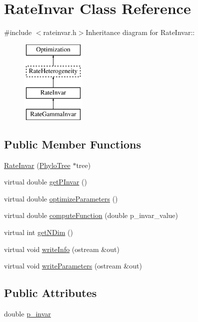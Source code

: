 \hypertarget{classRateInvar}{
\section{RateInvar Class Reference}
\label{classRateInvar}
}


{\ttfamily \#include $<$rateinvar.h$>$}Inheritance diagram for RateInvar::\begin{figure}[H]
\begin{center}
\leavevmode
\includegraphics[height=4cm]{classRateInvar}
\end{center}
\end{figure}
\subsection*{Public Member Functions}
\begin{DoxyCompactItemize}
\item 
\hyperlink{classRateInvar_ae78abd45146e41b786f6e0a7b8bd5747}{RateInvar} (\hyperlink{classPhyloTree}{PhyloTree} $\ast$tree)
\item 
virtual double \hyperlink{classRateInvar_a750aa513c32453d28cc50b14bb31a9a7}{getPInvar} ()
\item 
virtual double \hyperlink{classRateInvar_a593bcac4c771b4b69c2f286ed8789793}{optimizeParameters} ()
\item 
virtual double \hyperlink{classRateInvar_a23d4b3aed6205e4f121a3aee43996a49}{computeFunction} (double p\_\-invar\_\-value)
\item 
virtual int \hyperlink{classRateInvar_a3ffa388d5aa7f56bb2c047c35bc3b453}{getNDim} ()
\item 
virtual void \hyperlink{classRateInvar_a6b8c198319557891db9b91fb47b27428}{writeInfo} (ostream \&out)
\item 
virtual void \hyperlink{classRateInvar_aabcef1cc18777b54b0f8644ccb00913c}{writeParameters} (ostream \&out)
\end{DoxyCompactItemize}
\subsection*{Public Attributes}
\begin{DoxyCompactItemize}
\item 
double \hyperlink{classRateInvar_af6b377196f15c6f58d115b8c24ddf00f}{p\_\-invar}
\end{DoxyCompactItemize}


